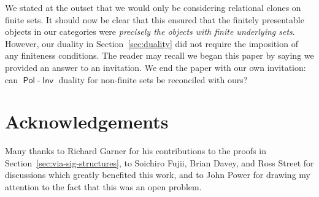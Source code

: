\documentclass[11pt, a4paper, twoside,leqno]{amsart}
\numberwithin{equation}{section}
\theoremstyle{plain}
\theoremstyle{definition}
\DeclareMathOperator{\Pol}{\mathsf{Pol}}
\DeclareMathOperator{\Inv}{\mathsf{Inv}}
\begin{document}
We stated at the outset that we would only be considering relational
clones 
on finite sets.
It should now be clear that this ensured that the finitely presentable
objects in our categories were \emph{precisely the objects with finite
  underlying sets}. However, our duality in Section~\ref{sec:duality} did not require the imposition
of any finiteness conditions. The reader may recall we began this paper by saying we provided an answer
to an invitation. We end the
paper with our own invitation: can
\(\Pol\)-\(\Inv\) duality for non-finite
sets be reconciled with ours?


\section*{Acknowledgements}
Many thanks to Richard Garner for his contributions to the proofs in Section~\ref{sec:via-sig-structures}, to Soichiro Fujii, Brian Davey,
and Ross Street for discussions which greatly benefited this work, and
to John Power for drawing my attention to the fact that this was an open problem.



 
\end{document}
